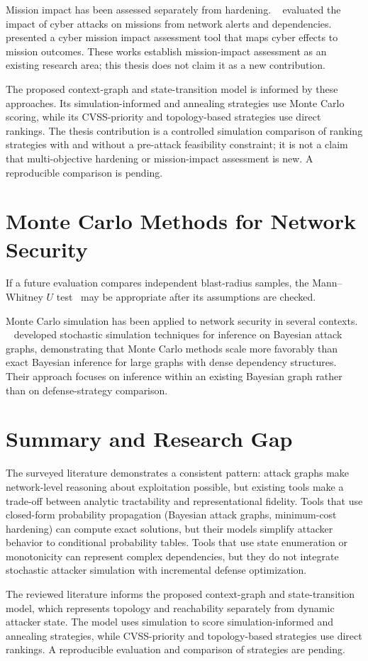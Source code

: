 Mission impact has been assessed separately from hardening. \citeauthor{holsopple15}~\cite{holsopple15} evaluated the impact of cyber attacks on missions from network alerts and dependencies. \citeauthor{musman15}~\cite{musman15} presented a cyber mission impact assessment tool that maps cyber effects to mission outcomes. These works establish mission-impact assessment as an existing research area; this thesis does not claim it as a new contribution.

The proposed context-graph and state-transition model is informed by these approaches. Its simulation-informed and annealing strategies use Monte Carlo scoring, while its CVSS-priority and topology-based strategies use direct rankings. The thesis contribution is a controlled simulation comparison of ranking strategies with and without a pre-attack feasibility constraint; it is not a claim that multi-objective hardening or mission-impact assessment is new. A reproducible comparison is pending.

\section{Monte Carlo Methods for Network Security}

If a future evaluation compares independent blast-radius samples, the Mann--Whitney $U$ test~\cite{mann47} may be appropriate after its assumptions are checked.

Monte Carlo simulation has been applied to network security in several contexts. \citeauthor{matthews21}~\cite{matthews21} developed stochastic simulation techniques for inference on Bayesian attack graphs, demonstrating that Monte Carlo methods scale more favorably than exact Bayesian inference for large graphs with dense dependency structures. Their approach focuses on inference within an existing Bayesian graph rather than on defense-strategy comparison.

\section{Summary and Research Gap}

The surveyed literature demonstrates a consistent pattern: attack graphs make network-level reasoning about exploitation possible, but existing tools make a trade-off between analytic tractability and representational fidelity. Tools that use closed-form probability propagation (Bayesian attack graphs, minimum-cost hardening) can compute exact solutions, but their models simplify attacker behavior to conditional probability tables. Tools that use state enumeration or monotonicity can represent complex dependencies, but they do not integrate stochastic attacker simulation with incremental defense optimization.

The reviewed literature informs the proposed context-graph and state-transition model, which represents topology and reachability separately from dynamic attacker state. The model uses simulation to score simulation-informed and annealing strategies, while CVSS-priority and topology-based strategies use direct rankings. A reproducible evaluation and comparison of strategies are pending.
